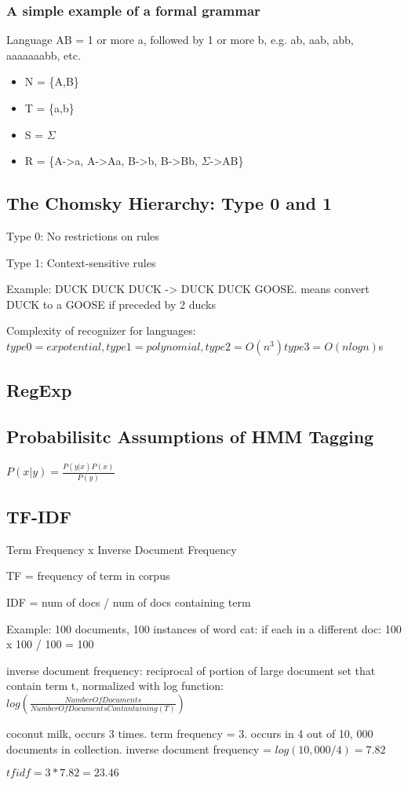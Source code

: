 \documentclass[a4paper]{article}
\begin{document}
\subsubsection{A simple example of a formal grammar}
Language AB = 1 or more a, followed by 1 or more b, e.g. ab, aab, abb, aaaaaaabb, etc.
\begin{itemize}
\item N = \{A,B\}
\item T = \{a,b\}
\item S = $\Sigma$
\item R = \{A->a, A->Aa, B->b, B->Bb, $\Sigma$->AB\}
\end{itemize}

\subsection{The Chomsky Hierarchy: Type 0 and 1}
\par{Type 0: No restrictions on rules}
\par{Type 1: Context-sensitive rules}
\par{Example: DUCK DUCK DUCK -> DUCK DUCK GOOSE. means convert DUCK to a GOOSE if preceded by 2 ducks}
\par{Complexity of recognizer for languages: $type 0 = expotential, type 1 = polynomial, type 2 = O(n^3) type 3 = O(nlogn)$s}

\subsection{RegExp}
\par{}

\subsection{Probabilisitc Assumptions of HMM Tagging}
\par{$P(x|y) = \frac{P(y|x)P(x)}{P(y)}$}

\subsection{TF-IDF}
\par{Term Frequency x Inverse Document Frequency}
\par{TF = frequency of term in corpus}
\par{IDF = num of docs / num of docs containing term}
\par{Example: 100 documents, 100 instances of word cat: if each in  a different doc: 100 x 100 / 100 = 100}
\par{inverse document frequency: reciprocal of portion of large document set that contain term t, normalized with log function: $log(\frac{NumberOfDocuments}{NumberOfDocumentsContantaining(T)})$}
\par{coconut milk, occurs 3 times. term frequency = 3. occurs in 4 out of 10, 000 documents in collection. inverse document frequency = $log(10,000/4) = 7.82$}
\par{$tfidf = 3 * 7.82 = 23.46$}
\end{document}
